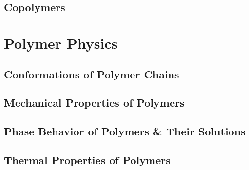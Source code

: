 \documentclass[book]{pogil}
\begin{document}
	\chapter{Copolymers}

\part{Polymer Physics}

	\chapter{Conformations of Polymer Chains}

	\chapter{Mechanical Properties of Polymers}
		
		

	\chapter{Phase Behavior of Polymers \& Their Solutions}
		
		
		

	\chapter{Thermal Properties of Polymers}





\backmatter
\end{document}
